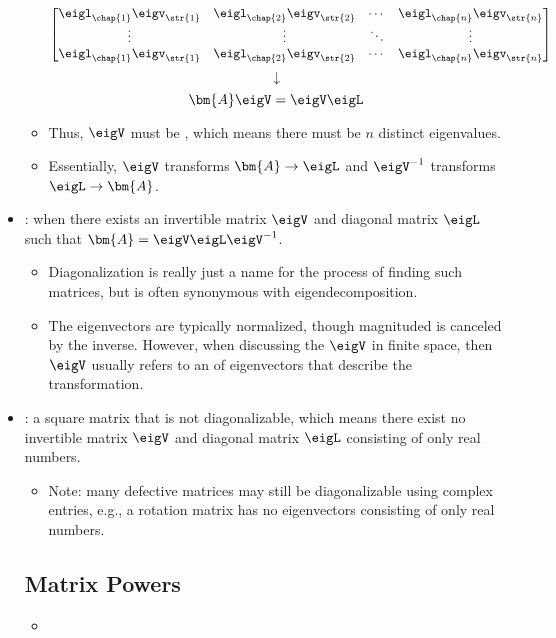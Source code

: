\begin{itemize}
\begin{itemize}
\[\begin{bmatrix}
    \eigl_{\chap{1}} \eigv_{\str{1}} & \eigl_\chap{2} \eigv_\str{2} & \cdots & \eigl_\chap{n} \eigv_\str{n} \\
    \vdots & \vdots & \ddots & \vdots \\
    \eigl_{\chap{1}} \eigv_{\str{1}} & \eigl_\chap{2} \eigv_\str{2} & \cdots & \eigl_\chap{n} \eigv_\str{n}
    \end{bmatrix}
    \]%
    \[%
    \downarrow
    \]%
    \[%
    \bm{A}\eigV = \eigV \eigL 
    \]%
    \item Thus, \(\eigV \) must be \hyperref[Matrix Inverse]{}, which means there must be \(n\) distinct eigenvalues. 
    \item Essentially, \(\eigV \) transforms \(\bm{A}\to \eigL\) and \(\eigV ^{-1}\) transforms \(\eigL \to \bm{A}\).
  \end{itemize}
  \item {}: when there exists an invertible matrix \(\eigV\) and diagonal matrix \(\eigL\) such that \(\bm{A} = \eigV \eigL \eigV ^{-1}\).
    \begin{itemize}
      \item Diagonalization is really just a name for the process of finding such matrices, but is often synonymous with eigendecomposition.
      \item The eigenvectors are typically normalized, though magnituded is canceled by the inverse. However, when discussing the \(\eigV\) in finite space, then \(\eigV \) usually refers to an \hyperref[Basis]{} of eigenvectors that describe the transformation.
    \end{itemize}
  \item {}: a square matrix that is not diagonalizable, which means there exist no invertible matrix \(\eigV\) and diagonal matrix \(\eigL \) consisting of only real numbers.
    \begin{itemize}
      \item Note: many defective matrices may still be diagonalizable using complex entries, e.g., a rotation matrix has no eigenvectors consisting of only real numbers.
    \end{itemize}
  \subsection{Matrix Powers}\label{Matrix Powers}
  \begin{itemize}
    \item 
  \end{itemize}
  
\end{itemize}

